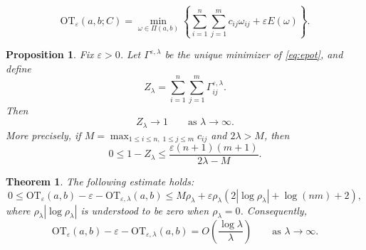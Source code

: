 \documentclass[10pt,a4paper]{amsart}
\newtheorem{prop}{Proposition}
\newtheorem{thm}{Theorem}
\newcommand{\OT}{\mathrm{OT}}
\newcommand{\eps}{\varepsilon}
\begin{document}
\begin{equation}\label{eq:eot}
  \OT_{\eps}(a,b;C) = \min_{\omega \in \Pi(a,b)} \left\{\sum_{i = 1}^{n}\sum_{j = 1}^{m}c_{ij}\omega_{ij} + \eps E(\omega)\right\}.
\end{equation}

\begin{prop}\label{prop:mass-convergence}
Fix $\eps > 0$. Let $\Gamma^{\eps,\lambda}$ be the unique minimizer of \eqref{eq:epot}, and define
\begin{equation*}
  Z_{\lambda} = \sum_{i=1}^{n}\sum_{j=1}^{m}\Gamma^{\eps,\lambda}_{ij}.
\end{equation*}
Then
\begin{equation}\label{eq:zlambda-to-one}
  Z_{\lambda}\to 1\qquad\text{as }\lambda \to \infty.
\end{equation}
More precisely, if $M = \displaystyle \max_{1\leq i\leq n,\;1\leq j\leq m}c_{ij}$ and $2\lambda > M$, then
\begin{equation}\label{eq:mass-rate}
  0 \leq 1 - Z_{\lambda} \leq \frac{\eps(n + 1)(m + 1)}{2\lambda - M}.
\end{equation}
\end{prop}

\begin{thm}\label{thm:value-error-estimate}
The following estimate holds: 
\begin{equation}\label{eq:value-error-estimate}
  0 \leq \OT_{\eps}(a,b)-\eps-\OT_{\eps,\lambda}(a,b) \leq M\rho_{\lambda} + \eps\rho_{\lambda}\left(2|\log\rho_{\lambda}| + \log(nm) + 2\right),
\end{equation}
where $\rho_{\lambda}|\log\rho_{\lambda}|$ is understood to be zero when $\rho_{\lambda}=0$. Consequently,
\begin{equation*}
  \OT_{\eps}(a,b)-\eps-\OT_{\eps,\lambda}(a,b) = O\left(\frac{\log\lambda}{\lambda}\right) \qquad\text{as }\lambda\to\infty.
\end{equation*}
\end{thm}
\end{document}
